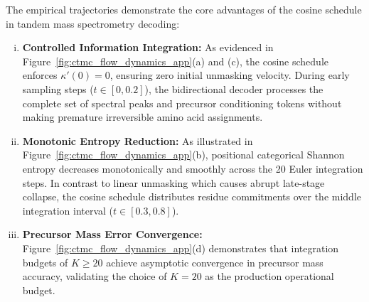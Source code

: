The empirical trajectories demonstrate the core advantages of the cosine schedule in tandem mass spectrometry decoding:
\begin{enumerate}[(i)]
\item \textbf{Controlled Information Integration:} As evidenced in Figure~\ref{fig:ctmc_flow_dynamics_app}(a) and (c), the cosine schedule enforces $\kappa'(0) = 0$, ensuring zero initial unmasking velocity. During early sampling steps ($t \in [0, 0.2]$), the bidirectional decoder processes the complete set of spectral peaks and precursor conditioning tokens without making premature irreversible amino acid assignments.
\item \textbf{Monotonic Entropy Reduction:} As illustrated in Figure~\ref{fig:ctmc_flow_dynamics_app}(b), positional categorical Shannon entropy decreases monotonically and smoothly across the 20 Euler integration steps. In contrast to linear unmasking which causes abrupt late-stage collapse, the cosine schedule distributes residue commitments over the middle integration interval ($t \in [0.3, 0.8]$).
\item \textbf{Precursor Mass Error Convergence:} Figure~\ref{fig:ctmc_flow_dynamics_app}(d) demonstrates that integration budgets of $K \ge 20$ achieve asymptotic convergence in precursor mass accuracy, validating the choice of $K=20$ as the production operational budget.
\end{enumerate}

